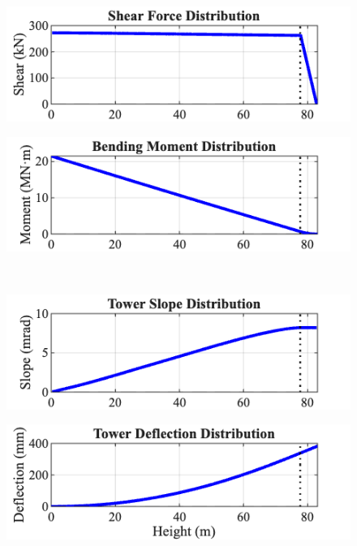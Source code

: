 \documentclass[11pt]{article}
\begin{document}
\begin{figure}[h]
  \centering
  \begin{minipage}{0.49\textwidth}
    \centering
    \includegraphics[width=\linewidth]{media/Shear_Distribution.png}
    \label{fig:tower_shear_distribution}
  \end{minipage}
  \hfill
  \begin{minipage}{0.49\textwidth}
    \centering
    \includegraphics[width=\linewidth]{media/Bending_Moment_Distribution.png}
    \label{fig:tower_moment_distribution}
  \end{minipage}
  \\
  \vspace{0.5em}
  \begin{minipage}{0.49\textwidth}
    \centering
    \includegraphics[width=\linewidth]{media/Slope_Distribution.png}
    \label{fig:tower_slope_distribution}
  \end{minipage}
  \hfill
  \begin{minipage}{0.49\textwidth}
    \centering
    \includegraphics[width=\linewidth]{media/Tower_Deflection_Analysis.png}
    \label{fig:tower_deflection_distribution}
  \end{minipage}
\end{figure}
\end{document}
